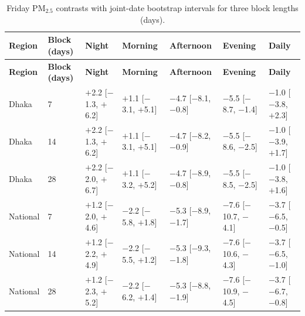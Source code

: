 \begingroup\scriptsize
\begin{longtable}{L{1.6cm} C{1.4cm} C{2.2cm} C{2.2cm} C{2.2cm} C{2.2cm} C{2.2cm}}
\caption{Friday PM$_{2.5}$ contrasts with joint-date bootstrap intervals for three block lengths (days).}\label{tab:s-blocklen}\\
\toprule
\textbf{Region} & \textbf{Block (days)} & \textbf{Night} & \textbf{Morning} & \textbf{Afternoon} & \textbf{Evening} & \textbf{Daily} \\
\midrule\endfirsthead
\toprule
\textbf{Region} & \textbf{Block (days)} & \textbf{Night} & \textbf{Morning} & \textbf{Afternoon} & \textbf{Evening} & \textbf{Daily} \\
\midrule\endhead
\bottomrule\endfoot
Dhaka & 7 & $+$2.2 {\scriptsize[$-$1.3, $+$6.2]} & $+$1.1 {\scriptsize[$-$3.1, $+$5.1]} & $-$4.7 {\scriptsize[$-$8.1, $-$0.8]} & $-$5.5 {\scriptsize[$-$8.7, $-$1.4]} & $-$1.0 {\scriptsize[$-$3.8, $+$2.3]} \\
Dhaka & 14 & $+$2.2 {\scriptsize[$-$1.3, $+$6.2]} & $+$1.1 {\scriptsize[$-$3.1, $+$5.1]} & $-$4.7 {\scriptsize[$-$8.2, $-$0.9]} & $-$5.5 {\scriptsize[$-$8.6, $-$2.5]} & $-$1.0 {\scriptsize[$-$3.9, $+$1.7]} \\
Dhaka & 28 & $+$2.2 {\scriptsize[$-$2.0, $+$6.7]} & $+$1.1 {\scriptsize[$-$3.2, $+$5.2]} & $-$4.7 {\scriptsize[$-$8.9, $-$0.8]} & $-$5.5 {\scriptsize[$-$8.5, $-$2.5]} & $-$1.0 {\scriptsize[$-$3.8, $+$1.6]} \\
National & 7 & $+$1.2 {\scriptsize[$-$2.0, $+$4.6]} & $-$2.2 {\scriptsize[$-$5.8, $+$1.8]} & $-$5.3 {\scriptsize[$-$8.9, $-$1.7]} & $-$7.6 {\scriptsize[$-$10.7, $-$4.1]} & $-$3.7 {\scriptsize[$-$6.5, $-$0.5]} \\
National & 14 & $+$1.2 {\scriptsize[$-$2.2, $+$4.9]} & $-$2.2 {\scriptsize[$-$5.5, $+$1.2]} & $-$5.3 {\scriptsize[$-$9.3, $-$1.8]} & $-$7.6 {\scriptsize[$-$10.6, $-$4.3]} & $-$3.7 {\scriptsize[$-$6.5, $-$1.0]} \\
National & 28 & $+$1.2 {\scriptsize[$-$2.3, $+$5.2]} & $-$2.2 {\scriptsize[$-$6.2, $+$1.4]} & $-$5.3 {\scriptsize[$-$8.8, $-$1.9]} & $-$7.6 {\scriptsize[$-$10.9, $-$4.5]} & $-$3.7 {\scriptsize[$-$6.7, $-$0.8]} \\
\end{longtable}
\endgroup
